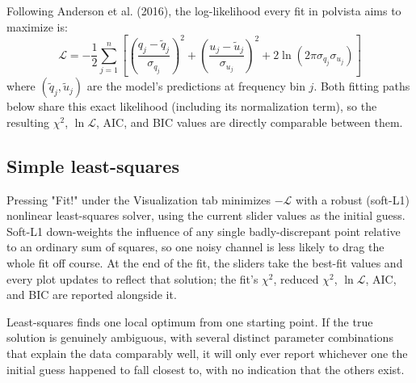 Following Anderson et al. (2016), the log-likelihood every fit in polvista aims to maximize is:
\begin{equation}\label{eq:loglike}
    \displaystyle \mathcal{L} = -\frac{1}{2}\sum_{j=1}^{n}\left[\left(\frac{q_j-\tilde q_j}{\sigma_{q_j}}\right)^2 + \left(\frac{u_j-\tilde u_j}{\sigma_{u_j}}\right)^2 + 2\ln\left(2\pi\sigma_{q_j}\sigma_{u_j}\right)\right]
\end{equation}
where $(\tilde q_j,\tilde u_j)$ are the model's predictions at frequency bin $j$. Both fitting paths below share this exact likelihood (including its normalization term), so the resulting $\chi^2$, $\ln\mathcal{L}$, AIC, and BIC values are directly comparable between them.
\\

\subsection{Simple least-squares}
Pressing "Fit!" under the Visualization tab minimizes $-\mathcal{L}$ with a robust (soft-L1) nonlinear least-squares solver, using the current slider values as the initial guess. Soft-L1 down-weights the influence of any single badly-discrepant point relative to an ordinary sum of squares, so one noisy channel is less likely to drag the whole fit off course. At the end of the fit, the sliders take the best-fit values and every plot updates to reflect that solution; the fit's $\chi^2$, reduced $\chi^2$, $\ln\mathcal{L}$, AIC, and BIC are reported alongside it.

Least-squares finds one local optimum from one starting point. If the true solution is genuinely ambiguous, with several distinct parameter combinations that explain the data comparably well, it will only ever report whichever one the initial guess happened to fall closest to, with no indication that the others exist.
\\

